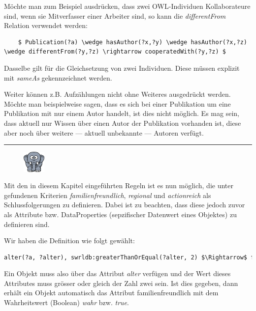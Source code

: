 Möchte man zum Beispiel ausdrücken, dass zwei OWL-Individuen Kollaborateure sind, wenn sie Mitverfasser einer Arbeiter sind, so kann die \textit{differentFrom} Relation verwendet werden:

\lstset{language=XML}
\begin{lstlisting}
    $ Publication(?a) \wedge hasAuthor(?x,?y) \wedge hasAuthor(?x,?z) \wedge differentFrom(?y,?z) \rightarrow cooperatedWith(?y,?z) $
\end{lstlisting}

Dasselbe gilt für die Gleichsetzung von zwei Individuen. Diese müssen explizit mit \textit{sameAs} gekennzeichnet werden.

Weiter können z.B. Aufzählungen nicht ohne Weiteres ausgedrückt werden. Möchte man beispielweise sagen, dass es sich bei einer Publikation um eine Publikation mit nur einem Autor handelt, ist dies nicht möglich. Es mag sein, dass aktuell nur Wissen über einen Autor der Publikation vorhanden ist, diese aber noch über weitere --- aktuell unbekannte --- Autoren verfügt.

\noindent\rule[1ex]{\textwidth}{1pt}
\begin{figure}
    \vspace{-14pt}
    \includegraphics[width=0.1\textwidth]{bilder/elephant.png}
\end{figure}
Mit den in diesem Kapitel eingeführten Regeln ist es nun möglich, die unter~\hyperref[elephant_graph_data]{} gefundenen Kriterien \textit{familienfreundlich}, \textit{regional} und \textit{actionreich} als Schlussfolgerungen zu definieren. Dabei ist zu beachten, dass diese jedoch zuvor als Attribute bzw. DataProperties (sepzifischer Datenwert eines Objektes) zu definieren sind.

Wir haben die Definition wie folgt gewählt:

\begin{lstlisting}[caption={Beispiel der SWRL-Regel für die Eigenschaft \textit{familienfreundlich}},captionpos=b,language=XML]
    alter(?a, ?alter), swrldb:greaterThanOrEqual(?alter, 2) $\Rightarrow$ familienfreundlich(?a, true)
\end{lstlisting}

Ein Objekt muss also über das Attribut \textit{alter} verfügen und der Wert dieses Attributes muss grösser oder gleich der Zahl zwei sein. Ist dies gegeben, dann erhält ein Objekt automatisch das Attribut familienfreundlich mit dem Wahrheitswert (Boolean) \textit{wahr} bzw. \textit{true}.

